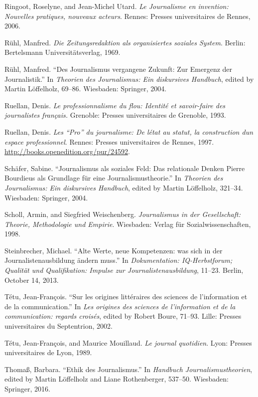 \documentclass{tufte-handout}
\begin{document}
\begin{hangparas}{.25in}{1}
Ringoot, Roselyne, and Jean-Michel Utard. \emph{Le Journalisme en
invention: Nouvelles pratiques, nouveaux acteurs}. Rennes: Presses
universitaires de Rennes, 2006.

Rühl, Manfred. \emph{Die Zeitungsredaktion als organisiertes soziales
System}. Berlin: Bertelsmann Universitätsverlag, 1969.

Rühl, Manfred. ``Des Journalismus vergangene Zukunft: Zur Emergenz der
Journalistik.'' In \emph{Theorien des Journalismus: Ein diskursives
Handbuch}, edited by Martin Löffelholz, 69--86. Wiesbaden: Springer,
2004.

Ruellan, Denis. \emph{Le professionnalisme du flou: Identité et
savoir-faire des journalistes français.} Grenoble: Presses
universitaires de Grenoble, 1993.

Ruellan, Denis. \emph{Les ``Pro'' du journalisme: De
l\textquotesingle état au statut, la construction d\textquotesingle un
espace professionnel}. Rennes: Presses universitaires de Rennes, 1997.
\url{http://books.openedition.org/pur/24592}.

Schäfer, Sabine. ``Journalismus als soziales Feld: Das relationale
Denken Pierre Bourdieus als Grundlage für eine Journalismustheorie.'' In
\emph{Theorien des Journalismus: Ein diskursives Handbuch}, edited by
Martin Löffelholz, 321--34. Wiesbaden: Springer, 2004.

Scholl, Armin, and Siegfried Weischenberg. \emph{Journalismus in der
Gesellschaft: Theorie, Methodologie und Empirie}. Wiesbaden: Verlag für
Sozialwissenschaften, 1998.

Steinbrecher, Michael. ``Alte Werte, neue Kompetenzen: was sich in der
Journalistenausbildung ändern muss.'' In \emph{Dokumentation:
IQ-Herbstforum; Qualität und Qualifikation: Impulse zur
Journalistenausbildung}, 11--23. Berlin, October 14, 2013.

Tétu, Jean-François. ``Sur les origines littéraires des sciences de
l'information et de la communication.'' In \emph{Les origines des
sciences de l'information et de la communication: regards croisés},
edited by Robert Boure, 71--93. Lille: Presses universitaires du
Septentrion, 2002.

Tétu, Jean-François, and Maurice Mouillaud. \emph{Le journal quotidien}.
Lyon: Presses universitaires de Lyon, 1989.

Thomaß, Barbara. ``Ethik des Journalismus.'' In \emph{Handbuch
Journalismustheorien}, edited by Martin Löffelholz and Liane
Rothenberger, 537--50. Wiesbaden: Springer, 2016.


\end{hangparas}
\end{document}
